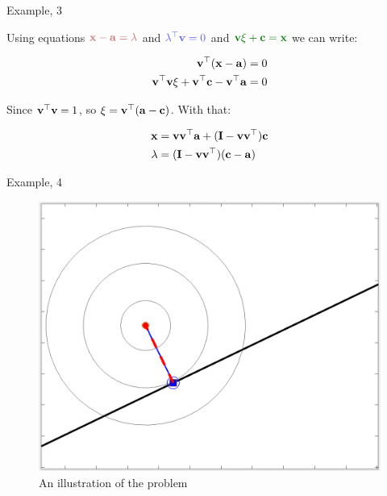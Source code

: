 \documentclass{beamer}
\begin{document}
\begin{frame}{Example, 3}
	\begin{flushleft}
		
		Using equations $\textcolor{myred}{\bo{x}- \bo{a} = \lambda}$ and $\textcolor{myblue}{\lambda\T \bo{v} = 0}$ and $\textcolor{mydarkgreen}{\bo{v} \xi + \bo{c} = \bo{x}}$ we can write:
		
		\begin{align}
			\mathbf{v}^\top (\mathbf{x}- \mathbf{a}) = 0
			\\
			\mathbf{v}^\top \mathbf{v} \xi + \mathbf{v}^\top\mathbf{c} - \mathbf{v}^\top \mathbf{a} = 0
		\end{align}
		
		Since $\mathbf{v}^\top \mathbf{v} = 1$, so $\xi  = \mathbf{v}^\top (\mathbf{a} - \mathbf{c})$. With that:
		
		\begin{align}
			\mathbf{x} &= \mathbf{v} \mathbf{v}^\top \mathbf{a} + (\mathbf{I} - \mathbf{v} \mathbf{v}^\top) \mathbf{c}
			\\
			\lambda &= (\mathbf{I} - \mathbf{v} \mathbf{v}^\top)(\mathbf{c} - \mathbf{a})
		\end{align}
		
		
	\end{flushleft}
\end{frame}



\begin{frame}{Example, 4}
	\begin{flushleft}
		
		\begin{figure}
			\centering
			\includegraphics[width=0.7\linewidth]{fig1}
			\caption{An illustration of the problem}
		\end{figure}
		
		
		
	\end{flushleft}
\end{frame}
\end{document}
